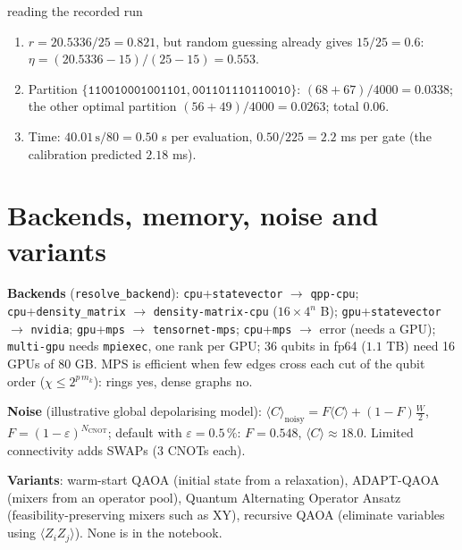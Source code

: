 \documentclass[11pt,a4paper,openany]{book}
\newcounter{wex}[chapter]
\newenvironment{steps}{\begin{enumerate}[label=\textbf{Step \arabic*.}, leftmargin=4.2em, itemsep=2pt]}{\end{enumerate}}
\begin{document}
\begin{wexample}{reading the recorded run}
\begin{steps}
\item $r = 20.5336/25 = 0.821$, but random guessing already gives $15/25 = 0.6$: $\eta = (20.5336 - 15)/(25 - 15) = 0.553$.
\item Partition $\{\texttt{110010001001101}, \texttt{001101110110010}\}$: $(68 + 67)/4000 = 0.0338$; the other optimal partition $(56 + 49)/4000 = 0.0263$; total $0.06$.
\item Time: $40.01\,\text{s}/80 = 0.50$ s per evaluation, $0.50/225 = 2.2$ ms per gate (the calibration predicted $2.18$ ms).
\end{steps}
\end{wexample}

\section{Backends, memory, noise and variants}
\begin{sloppypar}
\textbf{Backends} (\texttt{resolve\_backend}): \texttt{cpu}+\texttt{statevector} $\to$ \texttt{qpp-cpu}; \texttt{cpu}+\texttt{density\_matrix} $\to$
\texttt{density-matrix-cpu} ($16\times4^n$ B); \texttt{gpu}+\texttt{statevector} $\to$ \texttt{nvidia}; \texttt{gpu}+\texttt{mps} $\to$ \texttt{tensornet-mps};
\texttt{cpu}+\texttt{mps} $\to$ error (needs a GPU); \texttt{multi-gpu} needs \texttt{mpiexec}, one rank per GPU; 36 qubits in fp64 ($1.1$ TB) need 16 GPUs of 80 GB.
MPS is efficient when few edges cross each cut of the qubit order ($\chi \le 2^{p\,m_k}$): rings yes, dense graphs no.
\end{sloppypar}

\textbf{Noise} (illustrative global depolarising model): $\langle C\rangle_{\text{noisy}} = F\langle C\rangle + (1 - F)\frac W2$, $F = (1-\varepsilon)^{N_{\text{CNOT}}}$;
default with $\varepsilon = 0.5\,\%$: $F = 0.548$, $\langle C\rangle \approx 18.0$. Limited connectivity adds SWAPs (3 CNOTs each).

\textbf{Variants}: warm-start QAOA (initial state from a relaxation), ADAPT-QAOA (mixers from an operator pool), Quantum Alternating
Operator Ansatz (feasibility-preserving mixers such as XY), recursive QAOA (eliminate variables using $\langle Z_iZ_j\rangle$). None is in the notebook.
\end{document}
